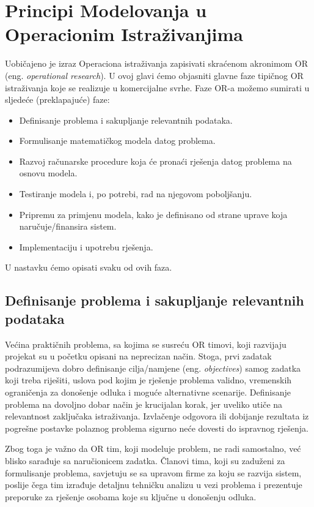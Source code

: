 \documentclass[a4paper, utf8, 11pt, colorlinks]{book}
\begin{document}
 
\chapter{Principi Modelovanja u Operacionim Istraživanjima}
Uobičajeno je izraz Operaciona istraživanja zapisivati skraćenom akronimom OR (eng. \emph{operational research}). 
U ovoj glavi ćemo objasniti   glavne faze tipičnog OR istraživanja koje se realizuje u  komercijalne svrhe. Faze OR-a možemo sumirati u sljedeće (preklapajuće) faze: 
\begin{itemize}
    \item Definisanje problema i sakupljanje relevantnih podataka.
    \item Formulisanje matematičkog modela datog problema.
    \item Razvoj računarske procedure koja će pronaći rješenja datog problema na osnovu modela.
    \item Testiranje modela i, po potrebi, rad na njegovom poboljšanju.
    \item Pripremu za primjenu modela, kako je definisano od strane uprave koja naručuje/finansira sistem.
    \item Implementaciju i upotrebu rješenja.
\end{itemize}
 U nastavku ćemo opisati svaku od ovih faza.
 
 \section{Definisanje problema i sakupljanje relevantnih podataka}
 
Većina praktičnih problema, sa kojima se susreću OR timovi, koji razvijaju projekat su u početku opisani na neprecizan način. Stoga, prvi zadatak podrazumijeva dobro definisanje  cilja/namjene  (eng. \emph{objectives}) samog zadatka koji treba riješiti, uslova pod kojim je rješenje problema validno,  vremenskih ograničenja za donošenje odluka i moguće alternativne scenarije.  Definisanje problema na dovoljno dobar način je krucijalan korak, jer uveliko utiče na relevantnost zaključaka istraživanja. Izvlačenje odgovora ili dobijanje rezultata iz pogrešne postavke polaznog problema sigurno neće dovesti do ispravnog rješenja.  

Zbog toga je važno da OR tim, koji   modeluje problem,  ne radi samostalno, već blisko sarađuje sa naručionicem zadatka. Članovi tima, koji su zaduženi za formulisanje problema, savjetuju se sa upravom firme za koju se razvija sistem, poslije čega tim izrađuje detaljnu tehničku analizu u vezi problema i prezentuje preporuke za rješenje  osobama koje su ključne u donošenju odluka.   
\end{document}
